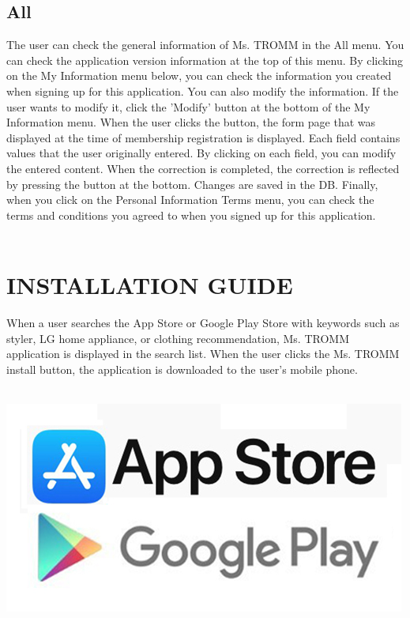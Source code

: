 \documentclass[conference]{IEEEtran}
\begin{document}
\subsection{All}
The user can check the general information of Ms. TROMM in the All menu. You can check the application version information at the top of this menu. By clicking on the My Information menu below, you can check the information you created when signing up for this application. You can also modify the information. If the user wants to modify it, click the 'Modify' button at the bottom of the My Information menu. When the user clicks the button, the form page that was displayed at the time of membership registration is displayed. Each field contains values that the user originally entered. By clicking on each field, you can modify the entered content. When the correction is completed, the correction is reflected by pressing the button at the bottom. Changes are saved in the DB. Finally, when you click on the Personal Information Terms menu, you can check the terms and conditions you agreed to when you signed up for this application. \\ \\

\section{INSTALLATION GUIDE}
When a user searches the App Store or Google Play Store with keywords such as styler, LG home appliance, or clothing recommendation, Ms. TROMM application is displayed in the search list. When the user clicks the Ms. TROMM install button, the application is downloaded to the user's mobile phone. \\ \\
\centerline{\includegraphics[scale=0.4]{assets/store.jpg}}
\end{document}

